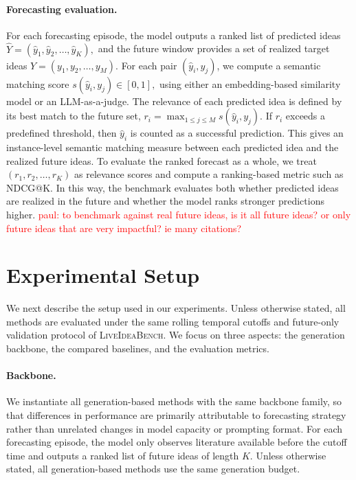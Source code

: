 \documentclass{article} %
\newcommand{\paul}[1]{\textcolor{red}{paul: #1}}
\begin{document}
\paragraph{Forecasting evaluation.}
For each forecasting episode, the model outputs a ranked list of predicted ideas
$
\hat{Y} = (\hat y_1, \hat y_2, \dots, \hat y_K),
$
and the future window provides a set of realized target ideas
$
Y = (y_1, y_2, \dots, y_M).
$
For each pair $(\hat y_i, y_j)$, we compute a semantic matching score
$
s(\hat y_i, y_j) \in [0,1],
$
using either an embedding-based similarity model or an LLM-as-a-judge. The relevance of each predicted idea is defined by its best match to the future set,
$
r_i = \max_{1 \le j \le M} s(\hat y_i, y_j).
$
If $r_i$ exceeds a predefined threshold, then $\hat y_i$ is counted as a successful prediction. This gives an instance-level semantic matching measure between each predicted idea and the realized future ideas. To evaluate the ranked forecast as a whole, we treat $(r_1, r_2, \dots, r_K)$ as relevance scores and compute a ranking-based metric such as NDCG@K. In this way, the benchmark evaluates both whether predicted ideas are realized in the future and whether the model ranks stronger predictions higher. \paul{to benchmark against real future ideas, is it all future ideas? or only future ideas that are very impactful? ie many citations?}

\section{Experimental Setup}

We next describe the setup used in our experiments. Unless otherwise stated, all methods are evaluated under the same rolling temporal cutoffs and future-only validation protocol of \textsc{LiveIdeaBench}. We focus on three aspects: the generation backbone, the compared baselines, and the evaluation metrics.

\paragraph{Backbone.}
We instantiate all generation-based methods with the same backbone family, so that differences in performance are primarily attributable to forecasting strategy rather than unrelated changes in model capacity or prompting format. For each forecasting episode, the model only observes literature available before the cutoff time and outputs a ranked list of future ideas of length $K$. Unless otherwise stated, all generation-based methods use the same generation budget.
\end{document}

